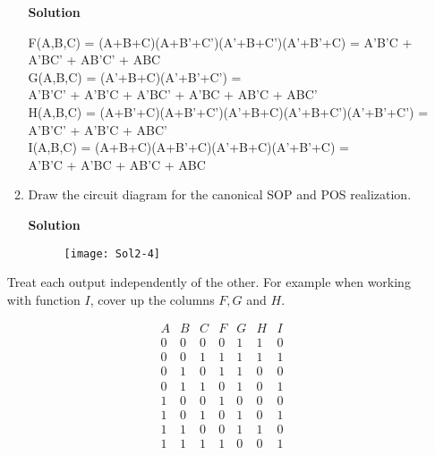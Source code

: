 \begin{enumerate}
\begin{enumerate}
                \begin{onlysolution}  \textbf{Solution} \itshape

                    F(A,B,C) = (A+B+C)(A+B'+C')(A'+B+C')(A'+B'+C)  =
                    A'B'C + A'BC' + AB'C' + ABC \\

                    G(A,B,C) = (A'+B+C)(A'+B'+C') = \\
                    A'B'C' + A'B'C + A'BC' + A'BC + AB'C + ABC'  \\

                    H(A,B,C) = (A+B'+C)(A+B'+C')(A'+B+C)(A'+B+C')(A'+B'+C') =\\
                    A'B'C' + A'B'C + ABC' \\

                    I(A,B,C) = (A+B+C)(A+B'+C)(A'+B+C)(A'+B'+C) =\\
                    A'B'C + A'BC + AB'C + ABC \\
                \end{onlysolution}

            \item Draw the circuit diagram for the canonical SOP and POS
                realization.

                \begin{onlysolution}  \textbf{Solution} \itshape
                    \begin{figure}[ht]
                        \texttt{[image: Sol2-4]}
                    \end{figure}
                \end{onlysolution}
        \end{enumerate}
        Treat each output independently of the other.  For example when
        working with function $I$, cover up the columns $F,G$ and $H$.

        $$
        \begin{array}{c|c|c||c|c|c|c}
            A & B & C & F & G & H & I \\ \hline
            0 & 0 & 0 & 0 & 1 & 1 & 0 \\ \hline
            0 & 0 & 1 & 1 & 1 & 1 & 1 \\ \hline
            0 & 1 & 0 & 1 & 1 & 0 & 0 \\ \hline
            0 & 1 & 1 & 0 & 1 & 0 & 1 \\ \hline
            1 & 0 & 0 & 1 & 0 & 0 & 0 \\ \hline
            1 & 0 & 1 & 0 & 1 & 0 & 1 \\ \hline
            1 & 1 & 0 & 0 & 1 & 1 & 0 \\ \hline
            1 & 1 & 1 & 1 & 0 & 0 & 1 \\
        \end{array}$$


\end{enumerate}
